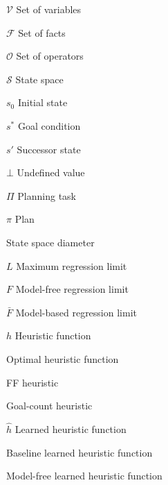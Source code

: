 \begin{listofsymbols}{\hgc}
    \item[$\mathcal{V}$] Set of variables
    \item[$\mathcal{F}$] Set of facts
    \item[$\mathcal{O}$] Set of operators
    \item[$\mathcal{S}$] State space
    \item[$s_0$] Initial state
    \item[$s^*$] Goal condition
    \item[$s'$] Successor state
    \item[$\bot$] Undefined value
    \item[$\Pi$] Planning task
    \item[$\pi$] Plan
    \item[\distfarthest] State space diameter
    \item[$L$] Maximum regression limit
    \item[$F$] Model-free regression limit
    \item[$\bar F$] Model-based regression limit
    \item[$h$] Heuristic function
    \item[\hstar] Optimal heuristic function
    \item[\hff] FF heuristic
    \item[\hgc] Goal-count heuristic
    \item[$\hat h$] Learned heuristic function
    \item[\hnnbase] Baseline learned heuristic function
    \item[\hnnnomutex] Model-free learned heuristic function
\end{listofsymbols}
